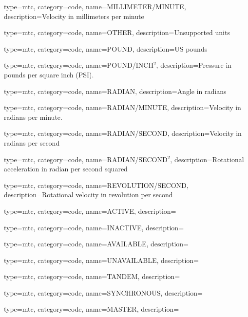 {
  type=mtc,
  category=code,
  name={MILLIMETER/MINUTE},
  description={Velocity in millimeters per minute}
}

{
  type=mtc,
  category=code,
  name={OTHER},
  description={Unsupported units}
}

{
  type=mtc,
  category=code,
  name={POUND},
  description={US pounds}
}

{
  type=mtc,
  category=code,
  name={POUND/INCH$^2$},
  description={Pressure in pounds per square inch (PSI).}
}

{
  type=mtc,
  category=code,
  name={RADIAN},
  description={Angle in radians}
}

{
  type=mtc,
  category=code,
  name={RADIAN/MINUTE},
  description={Velocity in radians per minute.}
}

{
  type=mtc,
  category=code,
  name={RADIAN/SECOND},
  description={Velocity in radians per second}
}

{
  type=mtc,
  category=code,
  name={RADIAN/SECOND$^2$},
  description={Rotational acceleration in radian per second squared}
}

{
  type=mtc,
  category=code,
  name={REVOLUTION/SECOND},
  description={Rotational velocity in revolution per second}
}


{
  type=mtc,
  category=code,
  name={ACTIVE},
  description={}
}

{
  type=mtc,
  category=code,
  name={INACTIVE},
  description={}
}

{
  type=mtc,
  category=code,
  name={AVAILABLE},
  description={}
}

{
  type=mtc,
  category=code,
  name={UNAVAILABLE},
  description={}
}

{
  type=mtc,
  category=code,
  name={TANDEM},
  description={}
}

{
  type=mtc,
  category=code,
  name={SYNCHRONOUS},
  description={}
}

{
  type=mtc,
  category=code,
  name={MASTER},
  description={}
}

